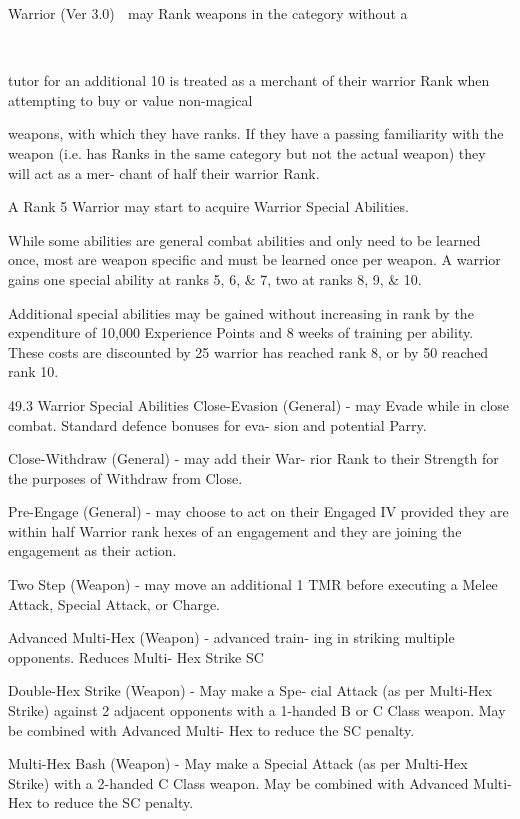 \begin{Chapter}{Warrior (Ver 3.0)}
  may Rank weapons in the category without a 

 

tutor for an additional 10%
is treated as a merchant of their warrior Rank 
when attempting to buy or value non-magical 

weapons, with which they have ranks. If they 
have  a  passing  familiarity  with  the  weapon 
(i.e.  has  Ranks  in  the  same  category  but  not 
the  actual  weapon)  they  will  act  as  a  mer-
chant of half their warrior Rank. 

A Rank 5 Warrior may start to acquire Warrior 
Special Abilities.  

While  some  abilities  are  general  combat  abilities 
and only need to be learned once, most are weapon 
specific  and  must  be  learned  once  per  weapon.  A 
warrior gains one special ability at ranks 5, 6, \& 7, 
two at ranks 8, 9, \& 10.  

Additional  special  abilities  may  be  gained  without 
increasing  in  rank  by  the  expenditure  of  10,000 
Experience  Points  and  8  weeks  of  training  per 
ability.  These  costs  are  discounted  by  25%
warrior has reached rank 8, or by 50%
reached rank 10.  

49.3 Warrior Special Abilities  
Close-Evasion  (General)  -  may  Evade  while  in 
close  combat.  Standard  defence  bonuses  for  eva-
sion and potential Parry.  

Close-Withdraw  (General)  -  may  add  their  War-
rior  Rank  to  their  Strength  for  the  purposes  of 
Withdraw from Close.  

Pre-Engage (General) - may choose to act on their 
Engaged  IV provided they are  within half Warrior 
rank  hexes  of  an  engagement  and  they  are  joining 
the engagement as their action.  

Two  Step  (Weapon)  -  may  move  an  additional  1 
TMR  before  executing  a  Melee  Attack,  Special 
Attack, or Charge.  

Advanced Multi-Hex (Weapon) - advanced train-
ing in striking multiple opponents. Reduces Multi-
Hex Strike SC%

Double-Hex Strike (Weapon) - May make a Spe-
cial  Attack  (as  per  Multi-Hex  Strike)  against  2 
adjacent  opponents  with  a  1-handed  B  or  C  Class 
weapon.  May  be  combined  with  Advanced  Multi-
Hex to reduce the SC penalty.  

Multi-Hex  Bash  (Weapon)  - May  make  a  Special 
Attack (as per Multi-Hex Strike) with a 2-handed C 
Class  weapon.  May  be  combined  with  Advanced 
Multi-Hex to reduce the SC penalty.  


\end{Chapter}
